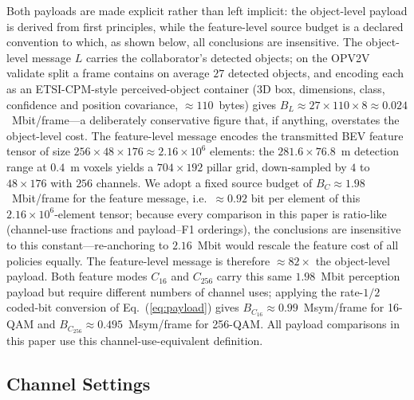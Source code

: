 \documentclass[journal]{IEEEtran}
\begin{document}
Both payloads are made explicit rather than left implicit: the object-level payload is derived from first principles, while the feature-level source budget is a declared convention to which, as shown below, all conclusions are insensitive. The object-level message $L$ carries the collaborator's detected objects; on the OPV2V validate split a frame contains on average $27$ detected objects, and encoding each as an ETSI-CPM-style perceived-object container (3D box, dimensions, class, confidence and position covariance, ${\approx}110$~bytes) gives $B_L \approx 27 \times 110 \times 8 \approx 0.024$~Mbit/frame---a deliberately conservative figure that, if anything, overstates the object-level cost. The feature-level message encodes the transmitted BEV feature tensor of size $256 \times 48 \times 176 \approx 2.16\times10^{6}$ elements: the $281.6 \times 76.8$~m detection range at $0.4$~m voxels yields a $704 \times 192$ pillar grid, down-sampled by $4$ to $48 \times 176$ with $256$ channels. We adopt a fixed source budget of $B_C \approx 1.98$~Mbit/frame for the feature message, i.e.\ ${\approx}0.92$ bit per element of this $2.16\times10^{6}$-element tensor; because every comparison in this paper is ratio-like (channel-use fractions and payload--F1 orderings), the conclusions are insensitive to this constant---re-anchoring to $2.16$~Mbit would rescale the feature cost of all policies equally. The feature-level message is therefore ${\approx}82\times$ the object-level payload. Both feature modes $C_{16}$ and $C_{256}$ carry this same $1.98$~Mbit perception payload but require different numbers of channel uses; applying the rate-$1/2$ coded-bit conversion of Eq.~(\ref{eq:payload}) gives $B_{C_{16}} \approx 0.99$~Msym/frame for 16-QAM and $B_{C_{256}} \approx 0.495$~Msym/frame for 256-QAM. All payload comparisons in this paper use this channel-use-equivalent definition.

\subsection{Channel Settings}
\end{document}
